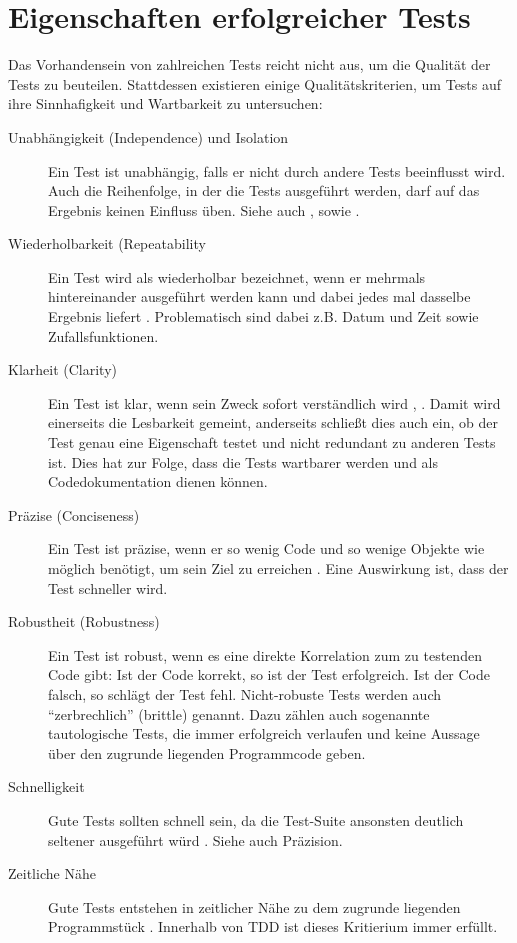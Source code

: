\appendix

\chapter{Eigenschaften erfolgreicher Tests}

Das Vorhandensein von zahlreichen Tests reicht nicht aus, um die Qualität der Tests zu beuteilen. Stattdessen existieren einige Qualitätskriterien, um Tests auf ihre Sinnhafigkeit und Wartbarkeit zu untersuchen:

\begin{description}
 \item[Unabhängigkeit (Independence) und Isolation] Ein Test ist unabhängig, falls er nicht durch andere Tests beeinflusst wird. Auch die Reihenfolge, in der die Tests ausgeführt werden, darf auf das Ergebnis keinen Einfluss üben. Siehe auch \citep{beck_test_2002}, \citep{palermo_guidelines_2006} sowie \citep[Karte 45]{langr_agile_2011}.
 \item[Wiederholbarkeit (Repeatability] Ein Test wird als wiederholbar bezeichnet, wenn er mehrmals hintereinander ausgeführt werden kann und dabei jedes mal dasselbe Ergebnis liefert \citep[Karte 45]{langr_agile_2011} \citep{rappin_rails_2011}. Problematisch sind dabei z.B. Datum und Zeit sowie Zufallsfunktionen.
 \item[Klarheit (Clarity)] Ein Test ist klar, wenn sein Zweck sofort verständlich wird \citep{rappin_rails_2011}, \citep{palermo_guidelines_2006}. Damit wird einerseits die Lesbarkeit gemeint, anderseits schließt dies auch ein, ob der Test genau eine Eigenschaft testet und nicht redundant zu anderen Tests ist. Dies hat zur Folge, dass die Tests wartbarer werden und als Codedokumentation dienen können.
 \item[Präzise (Conciseness)] Ein Test ist präzise, wenn er so wenig Code und so wenige Objekte wie möglich benötigt, um sein Ziel zu erreichen \citep{palermo_guidelines_2006} \citep{rappin_rails_2011}. Eine Auswirkung ist, dass der Test schneller wird.
 \item[Robustheit (Robustness)] Ein Test ist robust, wenn es eine direkte Korrelation zum zu testenden Code gibt: Ist der Code korrekt, so ist der Test erfolgreich. Ist der Code falsch, so schlägt der Test fehl. Nicht-robuste Tests werden auch "`zerbrechlich"' (brittle) genannt. Dazu zählen auch sogenannte tautologische Tests, die immer erfolgreich verlaufen und keine Aussage über den zugrunde liegenden Programmcode geben.
 \item[Schnelligkeit] Gute Tests sollten schnell sein, da die Test-Suite ansonsten deutlich seltener ausgeführt würd \citep{langr_agile_2011} \citep{palermo_guidelines_2006} \citep{nagappan_realizing_2008}. Siehe auch Präzision.
 \item[Zeitliche Nähe] Gute Tests entstehen in zeitlicher Nähe zu dem zugrunde liegenden Programmstück \citep{langr_agile_2011}. Innerhalb von TDD ist dieses Kritierium immer erfüllt.
 \end{description}

